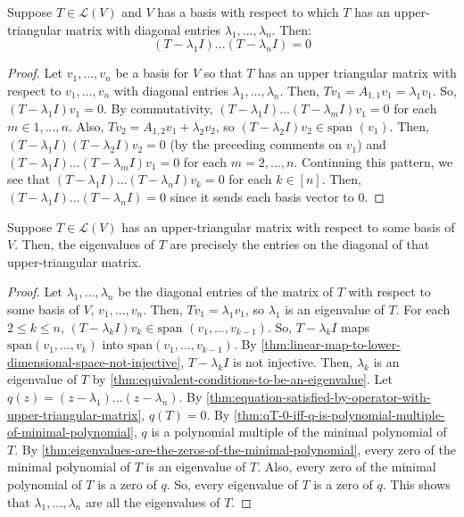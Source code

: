 \documentclass{article}
\begin{document}
\begin{theorem}
  \label{thm:equation-satisfied-by-operator-with-upper-triangular-matrix}
  Suppose $T \in \mathcal{L}(V)$ and $V$ has a basis with respect to
  which $T$ has an upper-triangular matrix with diagonal entries
  $\lambda_1, ..., \lambda_n$. Then:
  $$(T - \lambda_1 I)...(T - \lambda_n I) = 0$$
\end{theorem}
\begin{proof}
  Let $v_1, ..., v_n$ be a basis for $V$ so that $T$ has an upper
  triangular matrix with respect to $v_1, ..., v_n$ with diagonal
  entries $\lambda_1, ..., \lambda_n$. Then, $Tv_1 = A_{1, 1} v_1 =
  \lambda_1 v_1$. So, $(T - \lambda_1 I) v_1 = 0$. By commutativity,
  $(T - \lambda_1 I)...(T - \lambda_m I) v_1 = 0$ for each $m \in
  1,...,n$.
  Also, $Tv_2 = A_{1,2} v_1 + \lambda_2 v_2$, so $(T - \lambda_2 I)
  v_2 \in \text{span }(v_1)$. Then, $(T - \lambda_1 I) (T -
  \lambda_2 I) v_2 = 0$ (by the preceding comments on $v_1$) and $(T -
  \lambda_1 I) ... (T - \lambda_m I) v_1 = 0$ for each $m =
  2,...,n$. Continuing this pattern, we see that $(T - \lambda_1 I)
  ... (T - \lambda_n I) v_k = 0$ for each $k \in [n]$. Then, $(T -
  \lambda_1 I) ... (T - \lambda_n I) = 0$ since it sends each basis
  vector to $0$.
\end{proof}

\begin{theorem}
  \label{thm:eigenvalues-from-upper-triangular-matrix}
  Suppose $T \in \mathcal{L}(V)$ has an upper-triangular matrix with
  respect to some basis of $V$. Then, the eigenvalues of $T$ are
  precisely the entries on the diagonal of that upper-triangular matrix.
\end{theorem}
\begin{proof}
  Let $\lambda_1, ..., \lambda_n$ be the diagonal entries of the
  matrix of $T$ with respect to some basis of $V$, $v_1, ...,
  v_n$. Then, $Tv_1 = \lambda_1 v_1$, so $\lambda_1$ is an eigenvalue
  of $T$. For each $2 \le k \le n$, $(T - \lambda_k I) v_k \in
  \text{span }(v_1, ..., v_{k-1})$. So, $T - \lambda_k I$ maps
  $\text{span}(v_1, ..., v_k)$ into $\text{span}(v_1, ...,
  v_{k-1})$. By
  \cref{thm:linear-map-to-lower-dimensional-space-not-injective}, $T -
  \lambda_k I$ is not injective. Then, $\lambda_k$ is an eigenvalue of
  $T$ by \cref{thm:equivalent-conditions-to-be-an-eigenvalue}.
  Let $q(z) = (z - \lambda_1) ... (z - \lambda_n)$. By
  \cref{thm:equation-satisfied-by-operator-with-upper-triangular-matrix},
  $q(T) = 0$. By
  \cref{thm:qT-0-iff-q-is-polynomial-multiple-of-minimal-polynomial},
  $q$ is a polynomial multiple of the minimal polynomial of $T$. By
  \cref{thm:eigenvalues-are-the-zeros-of-the-minimal-polynomial},
  every zero of the minimal polynomial of $T$ is an
  eigenvalue of $T$. Also, every zero of the minimal polynomial of $T$ is a
  zero of $q$. So, every eigenvalue of $T$ is a zero of $q$. This
  shows that $\lambda_1, ..., \lambda_n$ are all the eigenvalues of $T$.
\end{proof}
\end{document}
